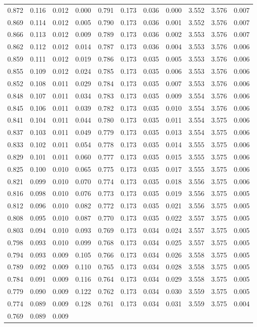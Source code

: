 \begin{table}[H]
\begin{tabular}{rrrrrrrrrrr}
        0.872 & 0.116 & 0.012 & 0.000 & 0.791 & 0.173 & 0.036 & 0.000 & 3.552 & 3.576 & 0.007 \\0.869 & 0.114 & 0.012 & 0.005 & 0.790 & 0.173 & 0.036 & 0.001 & 3.552 & 3.576 & 0.007 \\0.866 & 0.113 & 0.012 & 0.009 & 0.789 & 0.173 & 0.036 & 0.002 & 3.553 & 3.576 & 0.007 \\0.862 & 0.112 & 0.012 & 0.014 & 0.787 & 0.173 & 0.036 & 0.004 & 3.553 & 3.576 & 0.006 \\0.859 & 0.111 & 0.012 & 0.019 & 0.786 & 0.173 & 0.035 & 0.005 & 3.553 & 3.576 & 0.006 \\0.855 & 0.109 & 0.012 & 0.024 & 0.785 & 0.173 & 0.035 & 0.006 & 3.553 & 3.576 & 0.006 \\0.852 & 0.108 & 0.011 & 0.029 & 0.784 & 0.173 & 0.035 & 0.007 & 3.553 & 3.576 & 0.006 \\0.848 & 0.107 & 0.011 & 0.034 & 0.783 & 0.173 & 0.035 & 0.009 & 3.554 & 3.576 & 0.006 \\0.845 & 0.106 & 0.011 & 0.039 & 0.782 & 0.173 & 0.035 & 0.010 & 3.554 & 3.576 & 0.006 \\0.841 & 0.104 & 0.011 & 0.044 & 0.780 & 0.173 & 0.035 & 0.011 & 3.554 & 3.575 & 0.006 \\0.837 & 0.103 & 0.011 & 0.049 & 0.779 & 0.173 & 0.035 & 0.013 & 3.554 & 3.575 & 0.006 \\0.833 & 0.102 & 0.011 & 0.054 & 0.778 & 0.173 & 0.035 & 0.014 & 3.555 & 3.575 & 0.006 \\0.829 & 0.101 & 0.011 & 0.060 & 0.777 & 0.173 & 0.035 & 0.015 & 3.555 & 3.575 & 0.006 \\0.825 & 0.100 & 0.010 & 0.065 & 0.775 & 0.173 & 0.035 & 0.017 & 3.555 & 3.575 & 0.006 \\0.821 & 0.099 & 0.010 & 0.070 & 0.774 & 0.173 & 0.035 & 0.018 & 3.556 & 3.575 & 0.006 \\0.816 & 0.098 & 0.010 & 0.076 & 0.773 & 0.173 & 0.035 & 0.019 & 3.556 & 3.575 & 0.005 \\0.812 & 0.096 & 0.010 & 0.082 & 0.772 & 0.173 & 0.035 & 0.021 & 3.556 & 3.575 & 0.005 \\0.808 & 0.095 & 0.010 & 0.087 & 0.770 & 0.173 & 0.035 & 0.022 & 3.557 & 3.575 & 0.005 \\0.803 & 0.094 & 0.010 & 0.093 & 0.769 & 0.173 & 0.034 & 0.024 & 3.557 & 3.575 & 0.005 \\0.798 & 0.093 & 0.010 & 0.099 & 0.768 & 0.173 & 0.034 & 0.025 & 3.557 & 3.575 & 0.005 \\0.794 & 0.093 & 0.009 & 0.105 & 0.766 & 0.173 & 0.034 & 0.026 & 3.558 & 3.575 & 0.005 \\0.789 & 0.092 & 0.009 & 0.110 & 0.765 & 0.173 & 0.034 & 0.028 & 3.558 & 3.575 & 0.005 \\0.784 & 0.091 & 0.009 & 0.116 & 0.764 & 0.173 & 0.034 & 0.029 & 3.558 & 3.575 & 0.005 \\0.779 & 0.090 & 0.009 & 0.122 & 0.762 & 0.173 & 0.034 & 0.030 & 3.559 & 3.575 & 0.005 \\0.774 & 0.089 & 0.009 & 0.128 & 0.761 & 0.173 & 0.034 & 0.031 & 3.559 & 3.575 & 0.004 \\0.769 & 0.089 & 0.009 & 
\end{tabular}
\end{table}
